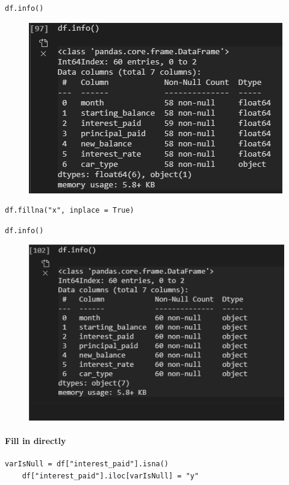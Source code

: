 \begin{lstlisting}[style=Python]
	df.info()
\end{lstlisting}
\begin{figure}[H]
	\centering
	\includegraphics[scale = 0.8]{attachment/chapter_4/Scc013}
\end{figure}
\begin{lstlisting}[style=Python]
	df.fillna("x", inplace = True)
\end{lstlisting}
\begin{lstlisting}[style=Python]
	df.info()
\end{lstlisting}
\begin{figure}[H]
	\centering
	\includegraphics[scale = 0.8]{attachment/chapter_4/Scc014}
\end{figure}

\paragraph{Fill in directly}
\begin{lstlisting}[style=Python]
	varIsNull = df["interest_paid"].isna()
	df["interest_paid"].iloc[varIsNull] = "y"
\end{lstlisting}

